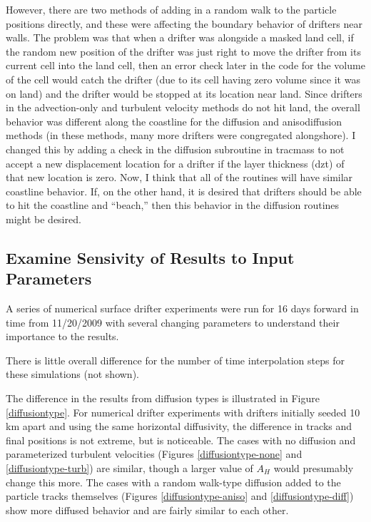 \documentclass[11pt]{article}
\begin{document}
However, there are two methods of adding in a random walk to the particle positions directly, and these were affecting the boundary behavior of drifters near walls. The problem was that when a drifter was alongside a masked land cell, if the random new position of the drifter was just right to move the drifter from its current cell into the land cell, then an error check later in the code for the volume of the cell would catch the drifter (due to its cell having zero volume since it was on land) and the drifter would be stopped at its location near land. Since drifters in the advection-only and turbulent velocity methods do not hit land, the overall behavior was different along the coastline for the diffusion and anisodiffusion methods (in these methods, many more drifters were congregated alongshore). I changed this by adding a check in the diffusion subroutine in tracmass to not accept a new displacement location for a drifter if the layer thickness (dzt) of that new location is zero. Now, I think that all of the routines will have similar coastline behavior. If, on the other hand, it is desired that drifters should be able to hit the coastline and ``beach,'' then this behavior in the diffusion routines might be desired.

\subsection{Examine Sensivity of Results to Input Parameters}

A series of numerical surface drifter experiments were run for 16 days forward in time from 11/20/2009 with several changing parameters to understand their importance to the results.

There is little overall difference for the number of time interpolation steps for these simulations (not shown).

The difference in the results from diffusion types is illustrated in Figure \ref{diffusiontype}. For numerical drifter experiments with drifters initially seeded 10 km apart and using the same horizontal diffusivity, the difference in tracks and final positions is not extreme, but is noticeable. The cases with no diffusion and parameterized turbulent velocities (Figures \ref{diffusiontype-none} and \ref{diffusiontype-turb}) are similar, though a larger value of $A_H$ would presumably change this more. The cases with a random walk-type diffusion added to the particle tracks themselves (Figures \ref{diffusiontype-aniso} and \ref{diffusiontype-diff}) show more diffused behavior and are fairly similar to each other.
\end{document}

